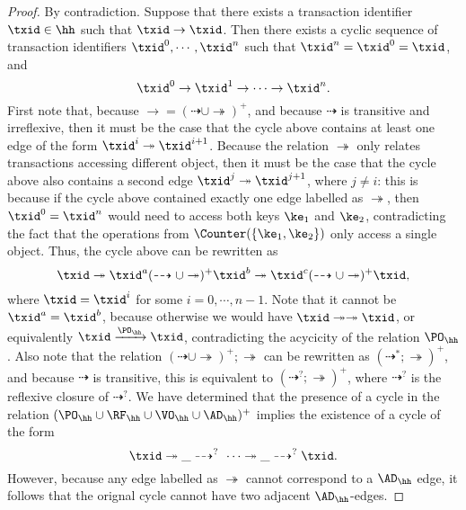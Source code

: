\begin{proof}
By contradiction. Suppose that there exists a transaction identifier $\txid \in \hh$ such that 
$\txid \rightarrow \txid$. Then there exists a cyclic sequence of transaction identifiers 
$\txid^{0}, \cdots, \txid^{n}$ such that $\txid^{n} =  \txid^{0} = \txid$, and
\[ 
\txid^{0} \rightarrow \txid^{1} \rightarrow \cdots \rightarrow \txid^{n}.
\]
First note that, because $\rightarrow = (\dashrightarrow \cup \twoheadrightarrow)^{+}$, 
and because $\dashrightarrow$ is transitive and irreflexive, then it must be the 
case that the cycle above contains at least one edge of the form $\txid^{i} \twoheadrightarrow \txid^{i+1}$. 
Because the relation $\twoheadrightarrow$ only relates transactions accessing different object, 
then it must be the case that the cycle above also contains a second edge $\txid^{j} \twoheadrightarrow \txid^{j+1}$, 
where $j \neq i$: this is because if the cycle above contained exactly one edge labelled as $\twoheadrightarrow$, 
then $\txid^{0} = \txid^{n}$ would need to access both keys $\ke_1$ and $\ke_2$, contradicting the 
fact that the operations from $\Counter(\{\ke_1, \ke_2\})$ only access a single object. 
Thus, the cycle above can be rewritten as 
\[ 
\txid \twoheadrightarrow \txid^{a} (\dashrightarrow \cup \twoheadrightarrow)^{+} \txid^{b} \twoheadrightarrow  \txid^{c} (\dashrightarrow \cup \twoheadrightarrow)^{+} \txid, 
\]
where $\txid = \txid^{i}$ for some $i=0,\cdots, n-1$. Note that it cannot be $\txid^{a} = \txid^{b}$, because 
otherwise we would have $\txid \twoheadrightarrow \twoheadrightarrow \txid$, or equivalently 
$\txid \xrightarrow{\PO_{\hh}} \txid$, contradicting the acycicity of the relation $\PO_{\hh}$. 
Also note that the relation $(\dashrightarrow \cup \twoheadrightarrow)^{+} ; \twoheadrightarrow$ can be rewritten as 
$(\dashrightarrow^{*} ; \twoheadrightarrow)^{+}$, and because $\dashrightarrow$ is transitive, 
this is equivalent to $(\dashrightarrow^{?} ; \twoheadrightarrow)^{+}$, where $\dashrightarrow^{?}$ is 
the reflexive closure of $\dashrightarrow^{?}$. 
We have determined that the presence of a cycle in the relation $(\PO_{\hh} \cup \RF_{\hh} \cup \VO_{\hh} \cup \AD_{\hh})^{+}$ 
implies the existence of a cycle of the form 
\[
\txid \twoheadrightarrow \_ \dashrightarrow^{?} \ \cdots \twoheadrightarrow \_ \dashrightarrow^{?} \txid.
\]
However, because any edge labelled as $\twoheadrightarrow$ cannot correspond to a $\AD_{\hh}$ edge, 
it follows that the orignal cycle cannot have two adjacent $\AD_{\hh}$-edges. 
%

\end{proof}
